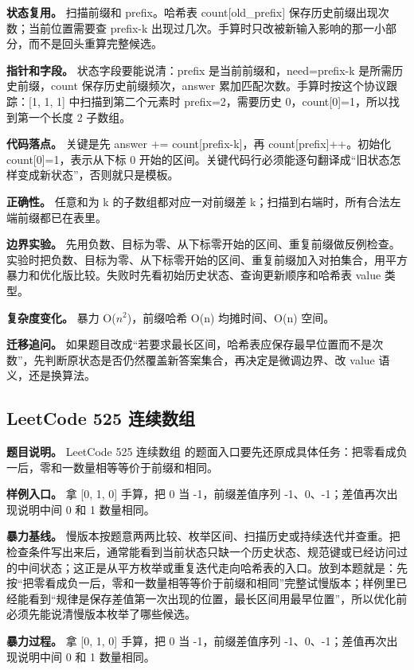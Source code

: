\textbf{状态复用。} 扫描前缀和 prefix。哈希表 count[old\_prefix] 保存历史前缀出现次数；当前位置需要查 prefix-k 出现过几次。手算时只改被新输入影响的那一小部分，而不是回头重算完整候选。

\textbf{指针和字段。} 状态字段要能说清：prefix 是当前前缀和，need=prefix-k 是所需历史前缀，count 保存历史前缀频次，answer 累加匹配次数。手算时按这个协议跟踪：[1, 1, 1] 中扫描到第二个元素时 prefix=2，需要历史 0，count[0]=1，所以找到第一个长度 2 子数组。

\textbf{代码落点。} 关键是先 answer += count[prefix-k]，再 count[prefix]++。初始化 count[0]=1，表示从下标 0 开始的区间。关键代码行必须能逐句翻译成“旧状态怎样变成新状态”，否则就只是模板。

\textbf{正确性。} 任意和为 k 的子数组都对应一对前缀差 k；扫描到右端时，所有合法左端前缀都已在表里。

\textbf{边界实验。} 先用负数、目标为零、从下标零开始的区间、重复前缀做反例检查。实验时把负数、目标为零、从下标零开始的区间、重复前缀加入对拍集合，用平方暴力和优化版比较。失败时先看初始历史状态、查询更新顺序和哈希表 value 类型。

\textbf{复杂度变化。} 暴力 O(\ensuremath{n^{2}})，前缀哈希 O(n) 均摊时间、O(n) 空间。

\textbf{迁移追问。} 如果题目改成“若要求最长区间，哈希表应保存最早位置而不是次数”，先判断原状态是否仍然覆盖新答案集合，再决定是微调边界、改 value 语义，还是换算法。

\subsection{LeetCode 525 连续数组}

\textbf{题目说明。} LeetCode 525 连续数组 的题面入口要先还原成具体任务：把零看成负一后，零和一数量相等等价于前缀和相同。

\textbf{样例入口。} 拿 [0, 1, 0] 手算，把 0 当 -1，前缀差值序列 -1、0、-1；差值再次出现说明中间 0 和 1 数量相同。

\textbf{暴力基线。} 慢版本按题意两两比较、枚举区间、扫描历史或持续迭代并查重。把检查条件写出来后，通常能看到当前状态只缺一个历史状态、规范键或已经访问过的中间状态；这正是从平方枚举或重复迭代走向哈希表的入口。放到本题就是：先按“把零看成负一后，零和一数量相等等价于前缀和相同”完整试慢版本；样例里已经能看到“规律是保存差值第一次出现的位置，最长区间用最早位置”，所以优化前必须先能说清慢版本枚举了哪些候选。

\textbf{暴力过程。} 拿 [0, 1, 0] 手算，把 0 当 -1，前缀差值序列 -1、0、-1；差值再次出现说明中间 0 和 1 数量相同。

